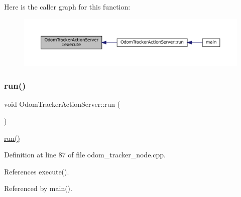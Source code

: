 Here is the caller graph for this function\+:
\nopagebreak
\begin{figure}[H]
\begin{center}
\leavevmode
\includegraphics[width=350pt]{classOdomTrackerActionServer_afa69287377bb2a12c5346cbe8d68cb04_icgraph}
\end{center}
\end{figure}
\mbox{\label{classOdomTrackerActionServer_a8ab6984c7383949a048d72437e9f79d3}} 
\subsubsection{\texorpdfstring{run()}{run()}}
{\footnotesize\ttfamily void Odom\+Tracker\+Action\+Server\+::run (\begin{DoxyParamCaption}{ }\end{DoxyParamCaption})\hspace{0.3cm}{\ttfamily [inline]}}

\hyperlink{classOdomTrackerActionServer_a8ab6984c7383949a048d72437e9f79d3}{run()} 

Definition at line 87 of file odom\+\_\+tracker\+\_\+node.\+cpp.



References execute().



Referenced by main().


